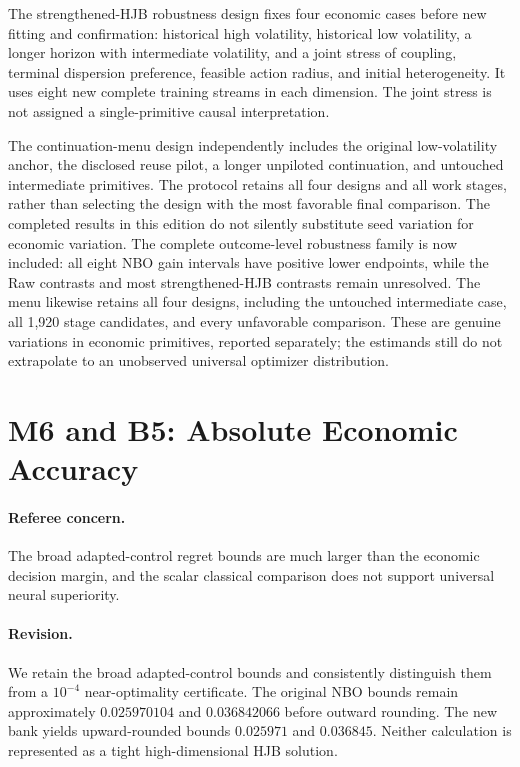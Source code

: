 The strengthened-HJB robustness design fixes four economic cases before new fitting and confirmation: historical high volatility, historical low volatility, a longer horizon with intermediate volatility, and a joint stress of coupling, terminal dispersion preference, feasible action radius, and initial heterogeneity. It uses eight new complete training streams in each dimension. The joint stress is not assigned a single-primitive causal interpretation.

The continuation-menu design independently includes the original low-volatility anchor, the disclosed reuse pilot, a longer unpiloted continuation, and untouched intermediate primitives. The protocol retains all four designs and all work stages, rather than selecting the design with the most favorable final comparison. The completed results in this edition do not silently substitute seed variation for economic variation. The complete outcome-level robustness family is now included: all eight NBO gain intervals have positive lower endpoints, while the Raw contrasts and most strengthened-HJB contrasts remain unresolved. The menu likewise retains all four designs, including the untouched intermediate case, all 1,920 stage candidates, and every unfavorable comparison. These are genuine variations in economic primitives, reported separately; the estimands still do not extrapolate to an unobserved universal optimizer distribution.

\section{M6 and B5: Absolute Economic Accuracy}
\paragraph*{Referee concern.} The broad adapted-control regret bounds are much larger than the economic decision margin, and the scalar classical comparison does not support universal neural superiority.

\paragraph*{Revision.} We retain the broad adapted-control bounds and consistently distinguish them from a $10^{-4}$ near-optimality certificate. The original NBO bounds remain approximately $0.025970104$ and $0.036842066$ before outward rounding. The new bank yields upward-rounded bounds $0.025971$ and $0.036845$. Neither calculation is represented as a tight high-dimensional HJB solution.


